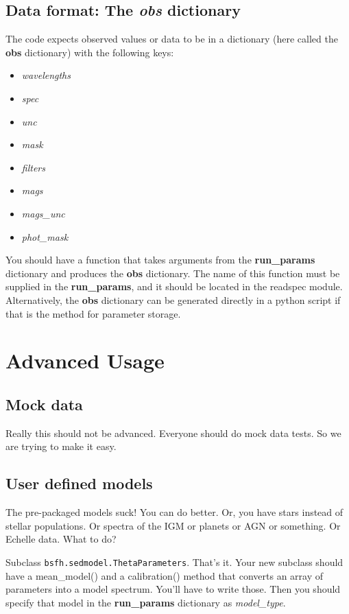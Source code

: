 \begin{itemize}
\subsection{Data format: The \emph{obs} dictionary}
The code expects observed values or data to be in a dictionary (here
called the {\bf obs} dictionary) with the following keys:
\begin{itemize}
\item {\it wavelengths}
\item {\it spec}
\item {\it unc}
\item {\it mask}
\item {\it filters}
\item {\it mags}
\item {\it mags_unc}
\item {\it phot_mask}
\end{itemize}

You should have a function that takes arguments from the {\bf
run_params} dictionary and produces the {\bf obs} dictionary.  The
name of this function must be supplied in the {\bf run_params}, and it
should be located in the readspec module. Alternatively, the {\bf obs}
dictionary can be generated directly in a python script if that is the
method for parameter storage.

\section{Advanced Usage}

\subsection{Mock data}
Really this should not be advanced.  Everyone should do mock data
tests.  So we are trying to make it easy.

\subsection{User defined models}
The pre-packaged models suck!  You can do better.  Or, you have stars
instead of stellar populations.  Or spectra of the IGM or planets or
AGN or something. Or Echelle data. What to do?

Subclass \texttt{bsfh.sedmodel.ThetaParameters}.  That's it.  Your new
subclass should have a mean_model() and a calibration() method that
converts an array of parameters into a model spectrum.  You'll have to
write those.  Then you should specify that model in the {\bf
run_params} dictionary as {\it model_type}.


\end{itemize}
